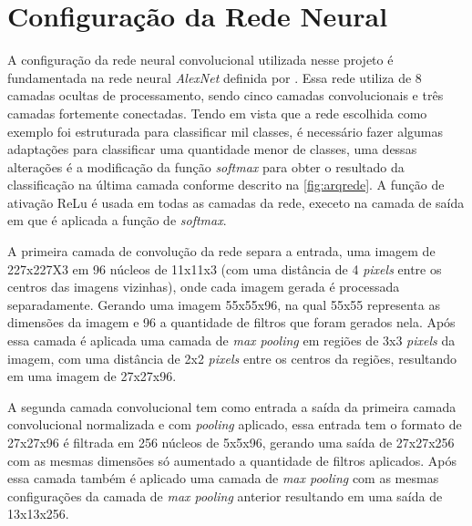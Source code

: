 


\section{Configuração da Rede Neural}

A configuração da rede neural convolucional utilizada nesse projeto é fundamentada na rede neural \textit{AlexNet} definida por . Essa rede utiliza de 8 camadas ocultas de processamento, sendo cinco camadas convolucionais e três camadas fortemente conectadas. Tendo em vista que a rede escolhida como exemplo foi estruturada para classificar mil classes, é necessário fazer algumas adaptações para classificar uma quantidade menor de classes, uma dessas alterações é a modificação da função \textit{softmax} para obter o resultado da classificação na última camada conforme descrito na \autoref{fig:arqrede}. A função de ativação ReLu é usada em todas as camadas da rede, execeto na camada de saída em que é aplicada a função de \textit{softmax}.

\par A primeira camada de convolução da rede separa a entrada, uma imagem de 227x227X3 em 96 núcleos de 11x11x3 (com uma distância de 4 \textit{pixels} entre os centros das imagens vizinhas), onde cada imagem gerada é processada separadamente. 
Gerando uma imagem 55x55x96, na qual 55x55 representa as dimensões da imagem e 96 a quantidade de filtros que foram gerados nela. Após essa camada é aplicada uma camada de \textit{max pooling} em regiões de 3x3 \textit{pixels} da imagem, com uma distância de 2x2 \textit{pixels} entre os centros da regiões, resultando em uma imagem de 27x27x96.

\par A segunda camada convolucional tem como entrada a saída da primeira camada convolucional normalizada e com \textit{pooling} aplicado, essa entrada tem o formato de 27x27x96 é filtrada em 256 núcleos de 5x5x96, gerando uma saída de 27x27x256 com as mesmas dimensões só aumentado a quantidade de filtros aplicados. Após essa camada também é aplicado uma camada de \textit{max pooling} com as mesmas configurações da camada de \textit{max pooling} anterior resultando em uma saída de 13x13x256.

